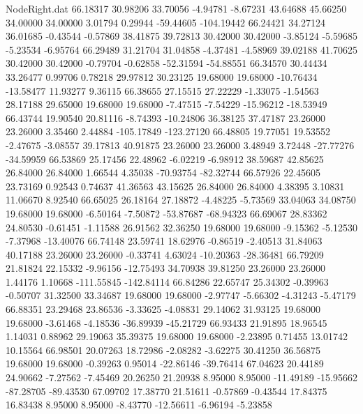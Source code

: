 \begin{filecontents}{NodeRight.dat}
  66.18317   30.98206   33.70056    -4.94781   -8.67231   43.64688   45.66250   34.00000   34.00000    3.01794    0.29944  -59.44605 -104.19442
  66.24421   34.27124   36.01685    -0.43544   -0.57869   38.41875   39.72813   30.42000   30.42000   -3.85124   -5.59685   -5.23534   -6.95764
  66.29489   31.21704   31.04858    -4.37481   -4.58969   39.02188   41.70625   30.42000   30.42000   -0.79704   -0.62858  -52.31594  -54.88551
  66.34570   30.44434   33.26477     0.99706    0.78218   29.97812   30.23125   19.68000   19.68000  -10.76434  -13.58477   11.93277    9.36115
  66.38655   27.15515   27.22229    -1.33075   -1.54563   28.17188   29.65000   19.68000   19.68000   -7.47515   -7.54229  -15.96212  -18.53949
  66.43744   19.90540   20.81116    -8.74393  -10.24806   36.38125   37.47187   23.26000   23.26000    3.35460    2.44884 -105.17849 -123.27120
  66.48805   19.77051   19.53552    -2.47675   -3.08557   39.17813   40.91875   23.26000   23.26000    3.48949    3.72448  -27.77276  -34.59959
  66.53869   25.17456   22.48962    -6.02219   -6.98912   38.59687   42.85625   26.84000   26.84000    1.66544    4.35038  -70.93754  -82.32744
  66.57926   22.45605   23.73169     0.92543    0.74637   41.36563   43.15625   26.84000   26.84000    4.38395    3.10831   11.06670    8.92540
  66.65025   26.18164   27.18872    -4.48225   -5.73569   33.04063   34.08750   19.68000   19.68000   -6.50164   -7.50872  -53.87687  -68.94323
  66.69067   28.83362   24.80530    -0.61451   -1.11588   26.91562   32.36250   19.68000   19.68000   -9.15362   -5.12530   -7.37968  -13.40076
  66.74148   23.59741   18.62976    -0.86519   -2.40513   31.84063   40.17188   23.26000   23.26000   -0.33741    4.63024  -10.20363  -28.36481
  66.79209   21.81824   22.15332    -9.96156  -12.75493   34.70938   39.81250   23.26000   23.26000    1.44176    1.10668 -111.55845 -142.84114
  66.84286   22.65747   25.34302    -0.39963   -0.50707   31.32500   33.34687   19.68000   19.68000   -2.97747   -5.66302   -4.31243   -5.47179
  66.88351   23.29468   23.86536    -3.33625   -4.08831   29.14062   31.93125   19.68000   19.68000   -3.61468   -4.18536  -36.89939  -45.21729
  66.93433   21.91895   18.96545     1.14031    0.88962   29.19063   35.39375   19.68000   19.68000   -2.23895    0.71455   13.01742   10.15564
  66.98501   20.07263   18.72986    -2.08282   -3.62275   30.41250   36.56875   19.68000   19.68000   -0.39263    0.95014  -22.86146  -39.76414
  67.04623   20.44189   24.90662    -7.27562   -7.45469   20.26250   21.20938    8.95000    8.95000  -11.49189  -15.95662  -87.28705  -89.43530
  67.09702   17.38770   21.51611    -0.57869   -0.43544   17.84375   16.83438    8.95000    8.95000   -8.43770  -12.56611   -6.96194   -5.23858

\end{filecontents}
